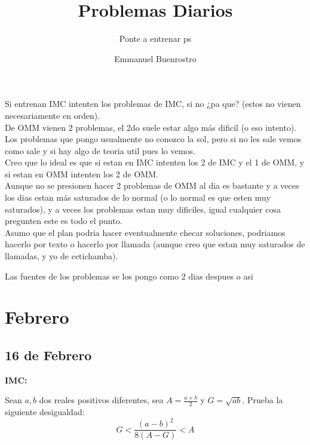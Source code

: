 \documentclass[11pt]{scrartcl}
\title {Problemas Diarios}
\subtitle {Ponte a entrenar ps}
\author{Emmanuel Buenrostro}
\begin{document}
\maketitle
\tableofcontents



Si entrenan IMC intenten los problemas de IMC, si no ¿pa que? (estos no vienen necesariamente en orden). \\

De OMM vienen 2 problemas, el 2do suele estar algo más dificil (o eso intento). \\

Los problemas que pongo usualmente no conozco la sol, pero si no les sale vemos como sale y si hay algo de teoria util pues lo vemos. \\

Creo que lo ideal es que si estan en IMC intenten los 2 de IMC y el 1 de OMM, y si estan en OMM intenten los 2 de OMM. \\

Aunque no se presionen hacer 2 problemas de OMM al dia es bastante y a veces los dias estan más saturados de lo normal (o lo normal es que esten muy saturados), y a veces los problemas estan muy dificiles, igual cualquier cosa pregunten este es todo el punto. \\

Asumo que el plan podria hacer eventualmente checar soluciones, podriamos hacerlo por texto o hacerlo por llamada (aunque creo que estan muy saturados de llamadas, y yo de cetichamba).

Las fuentes de los problemas se los pongo como 2 dias despues o asi 

\newpage
\section{Febrero}
\subsection{16 de Febrero}
\textbf{IMC: }
\begin{problem} [IMC 2001/13]
    Sean $a,b$ dos reales positivos diferentes, sea $A=\frac{a+b}{2}$ y $G=\sqrt{ab}$. Prueba la siguiente desigualdad:
    \[G < \frac{(a-b)^2}{8(A-G)}<A\]
\end{problem}
\end{document}
